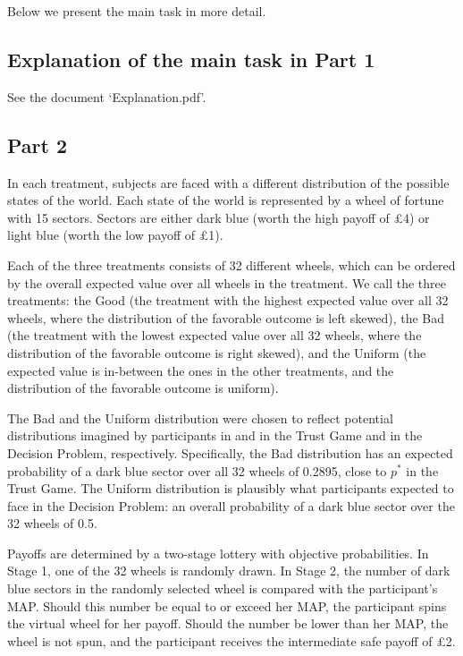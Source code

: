 Below we present the main task in more detail.

\subsection{Explanation of the main task in Part 1}
See the document `Explanation.pdf'.


\subsection{Part 2}
In each treatment, subjects are faced with a different distribution of the possible states of the world.
Each state of the world is represented by a wheel of fortune with 15 sectors.
Sectors are either dark blue (worth the high payoff of \pounds4) or light blue (worth the low payoff of \pounds1).

Each of the three treatments consists of 32 different wheels, which can be ordered by the overall expected value over all wheels in the treatment.
We call the three treatments: the Good (the treatment with the highest expected value over all 32 wheels, where the distribution of the favorable outcome is left skewed), the Bad (the treatment with the lowest expected value over all 32 wheels, where the distribution of the favorable outcome is right skewed), and the Uniform (the expected value is in-between the ones in the other treatments, and the distribution of the favorable outcome is uniform).

The Bad and the Uniform distribution were chosen to reflect potential distributions imagined by participants in \cite{Bohnet2004} and \cite{Bohnet2008} in the Trust Game and in the Decision Problem, respectively.
Specifically, the Bad distribution has an expected probability of a dark blue sector over all 32 wheels of 0.2895, close to $p^*$ in the Trust Game.
The Uniform distribution is plausibly what participants expected to face in the Decision Problem: an overall probability of a dark blue sector over the 32 wheels of 0.5.

Payoffs are determined by a two-stage lottery with objective probabilities.
In Stage 1, one of the 32 wheels is randomly drawn.
In Stage 2, the number of dark blue sectors in the randomly selected wheel is compared with the participant's MAP.
Should this number be equal to or exceed her MAP, the participant spins the virtual wheel for her payoff.
Should the number be lower than her MAP, the wheel is not spun, and the participant receives the intermediate safe payoff of \pounds2.

